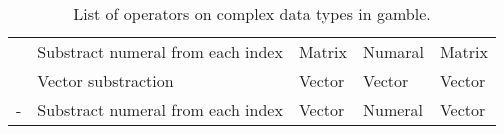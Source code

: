 \begin{table}[ht]
\begin{tabular}{|c|l|l|l|l|}
                    & Substract numeral from each index         & Matrix                           & Numaral                           & Matrix                          \\ \cline{2-5}
                    & \cellcolor{gray!40}Vector substraction    & \cellcolor{gray!40}Vector        & \cellcolor{gray!40}Vector         & \cellcolor{gray!40}Vector       \\ \cline{2-5} 
\multirow{-4}{*}{-} & Substract numeral from each index         & Vector                           & Numeral                           & Vector                          \\ \hline
\end{tabular}
\caption{List of operators on complex data types in \gls{gamble}. }\label{tbl:matOps}
\end{table}